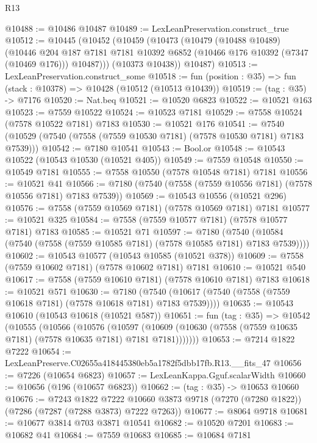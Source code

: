 \begin{lexlean}{R13}
\begin{coremodule}
@10488 := @10486 @10487
@10489 := LexLeanPreservation.construct_true
@10512 := @10445
    (@10452
      (@10459
        (@10473
          (@10479
            (@10488 @10489)
            (@10446
              @204
              @187
              @7181
              @7181
              @10392
              @6852
              (@10466 @176 @10392 (@7347 (@10469 @176)))
              @10487)))
        (@10373 @10438))
      @10487)
@10513 := LexLeanPreservation.construct_some
@10518 := fun (position : @35) => fun (stack : @10378) => @10428 (@10512 (@10513 @10439))
@10519 := (tag : @35) -> @7176
@10520 := Nat.beq
@10521 := @10520 @6823
@10522 := @10521 @163
@10523 := @7559 @10522
@10524 := @10523 @7181
@10529 := @7558 @10524 (@7578 @10522 @7181) @7183
@10530 := @10521 @176
@10541 := @7540 (@10529 (@7540 (@7558 (@7559 @10530 @7181) (@7578 @10530 @7181) @7183 @7539)))
@10542 := @7180 @10541
@10543 := Bool.or
@10548 := @10543 @10522 (@10543 @10530 (@10521 @405))
@10549 := @7559 @10548
@10550 := @10549 @7181
@10555 := @7558 @10550 (@7578 @10548 @7181) @7181
@10556 := @10521 @41
@10566 := @7180 (@7540 (@7558 (@7559 @10556 @7181) (@7578 @10556 @7181) @7183 @7539))
@10569 := @10543 @10556 (@10521 @296)
@10576 := @7558 (@7559 @10569 @7181) (@7578 @10569 @7181) @7181
@10577 := @10521 @325
@10584 := @7558 (@7559 @10577 @7181) (@7578 @10577 @7181) @7183
@10585 := @10521 @71
@10597 := @7180
    (@7540 (@10584 (@7540 (@7558 (@7559 @10585 @7181) (@7578 @10585 @7181) @7183 @7539))))
@10602 := @10543 @10577 (@10543 @10585 (@10521 @378))
@10609 := @7558 (@7559 @10602 @7181) (@7578 @10602 @7181) @7181
@10610 := @10521 @540
@10617 := @7558 (@7559 @10610 @7181) (@7578 @10610 @7181) @7183
@10618 := @10521 @571
@10630 := @7180
    (@7540 (@10617 (@7540 (@7558 (@7559 @10618 @7181) (@7578 @10618 @7181) @7183 @7539))))
@10635 := @10543 @10610 (@10543 @10618 (@10521 @587))
@10651 := fun (tag : @35) =>
  @10542
    (@10555
      (@10566
        (@10576
          (@10597
            (@10609 (@10630 (@7558 (@7559 @10635 @7181) (@7578 @10635 @7181) @7181 @7181)))))))
@10653 := @7214 @1822 @7222
@10654 := LexLeanPreserve.C02655a418445380eb5a1782f5dbb17fb.R13.__fits_47
@10656 := @7226 (@10654 @6823)
@10657 := LexLeanKappa.Gguf.scalarWidth
@10660 := @10656 (@196 (@10657 @6823))
@10662 := (tag : @35) -> @10653 @10660
@10676 := @7243
    @1822
    @7222
    @10660
    @3873
    @9718
    (@7270 (@7280 @1822))
    (@7286 (@7287 (@7288 @3873) @7222 @7263))
@10677 := @8064 @9718
@10681 := @10677 @3814 @703 @3871 @10541
@10682 := @10520 @7201
@10683 := @10682 @41
@10684 := @7559 @10683
@10685 := @10684 @7181

\end{coremodule}
\end{lexlean}
